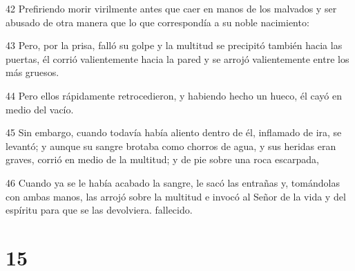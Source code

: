 \par 42 Prefiriendo morir virilmente antes que caer en manos de los malvados y ser abusado de otra manera que lo que correspondía a su noble nacimiento:
\par 43 Pero, por la prisa, falló su golpe y la multitud se precipitó también hacia las puertas, él corrió valientemente hacia la pared y se arrojó valientemente entre los más gruesos.
\par 44 Pero ellos rápidamente retrocedieron, y habiendo hecho un hueco, él cayó en medio del vacío.
\par 45 Sin embargo, cuando todavía había aliento dentro de él, inflamado de ira, se levantó; y aunque su sangre brotaba como chorros de agua, y sus heridas eran graves, corrió en medio de la multitud; y de pie sobre una roca escarpada,
\par 46 Cuando ya se le había acabado la sangre, le sacó las entrañas y, tomándolas con ambas manos, las arrojó sobre la multitud e invocó al Señor de la vida y del espíritu para que se las devolviera. fallecido.

\chapter{15}

